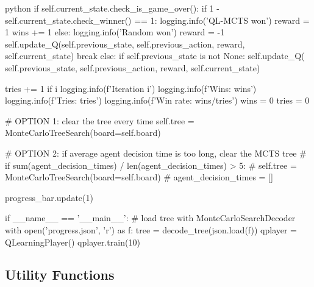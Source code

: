 \begin{mintedbox}{python}
                if self.current_state.check_is_game_over():
                    if 1 - self.current_state.check_winner() == 1:
                        logging.info('QL-MCTS won')
                        reward = 1
                        wins += 1
                    else:
                        logging.info('Random won')
                        reward = -1
                    self.update_Q(self.previous_state, self.previous_action,
                                    reward, self.current_state)
                    break
                else:
                    if self.previous_state is not None:
                        self.update_Q(
                            self.previous_state, self.previous_action, reward, self.current_state)

            tries += 1
            if i %
                logging.info(f'Iteration {i}')
                logging.info(f'Wins: {wins}')
                logging.info(f'Tries: {tries}')
                logging.info(f'Win rate: {wins/tries}')
                wins = 0
                tries = 0

            # OPTION 1: clear the tree every time
            self.tree = MonteCarloTreeSearch(board=self.board)

            # OPTION 2: if average agent decision time is too long, clear the MCTS tree
            # if sum(agent_decision_times) / len(agent_decision_times) > 5:
            #     self.tree = MonteCarloTreeSearch(board=self.board)
            #     agent_decision_times = []

            progress_bar.update(1)


if __name__ == '__main__':
    # load tree with MonteCarloSearchDecoder
    with open('progress.json', 'r') as f:
        tree = decode_tree(json.load(f))
    qplayer = QLearningPlayer()
    qplayer.train(10)

\end{mintedbox}

\subsection{Utility Functions}

